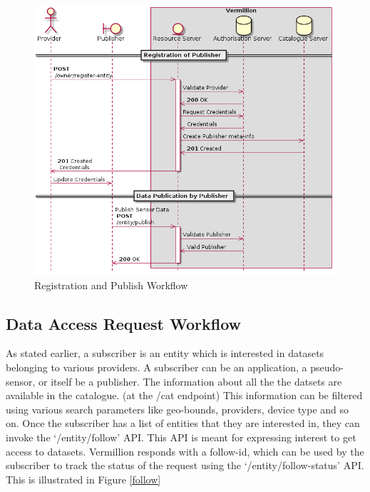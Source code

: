 \documentclass[conference, 10pt]{IEEEtran}
\begin{document}
\begin{figure}[H]
\includegraphics[width=\linewidth, height=\linewidth, keepaspectratio]{reg-and-pub.png}
\caption{Registration and Publish Workflow}
\label{registration}
\end{figure}

\subsection{Data Access Request Workflow}

As stated earlier, a subscriber is an entity which is interested in datasets belonging to various providers. A subscriber can be an application, a pseudo-sensor, or itself be a publisher. The information about all the the datsets are available in the catalogue. (at the /cat endpoint) This information can be filtered using various search parameters like geo-bounds, providers, device type and so on. Once the subscriber has a list of entities that they are interested in, they can invoke the ‘/entity/follow’ API. This API is meant for expressing interest to get access to datasets. Vermillion responds with a follow-id, which can be used by the subscriber to track the status of the request using the ‘/entity/follow-status’ API. This is illustrated in Figure \ref{follow}
\end{document}
